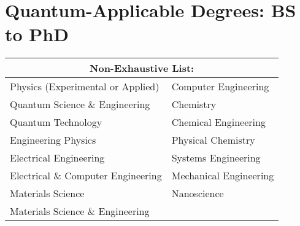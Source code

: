 \chapter{\LARGE Quantum-Applicable Degrees: BS to PhD}

{
\Large\begin{tabular}{ |p{8cm}|p{6cm}| }
 \hline
 \multicolumn{2}{|c|}{Non-Exhaustive List:} \\
 \hline
Physics (Experimental or Applied) & Computer Engineering \\
Quantum Science \& Engineering & Chemistry \\
Quantum Technology & Chemical Engineering \\
Engineering Physics & Physical Chemistry \\
Electrical Engineering & Systems Engineering \\
Electrical \& Computer Engineering & Mechanical Engineering \\
Materials Science & Nanoscience \\
Materials Science \& Engineering & \\
\hline
\end{tabular}
}
